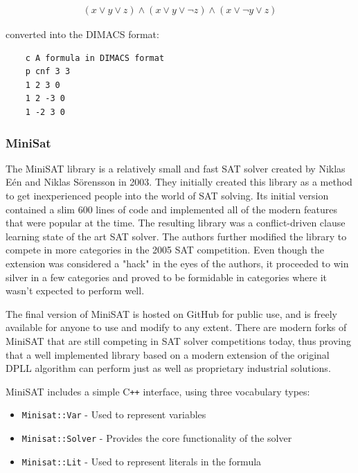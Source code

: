 \documentclass{article}
\begin{document}
\begin{gather*}
    (x\vee y\vee z)\wedge (x\vee y\vee \neg z)\wedge (x\vee \neg y\vee z)
\end{gather*}

converted into the DIMACS format:

\begin{lstlisting}
    c A formula in DIMACS format
    p cnf 3 3
    1 2 3 0
    1 2 -3 0
    1 -2 3 0
\end{lstlisting}


    \subsubsection{MiniSat}
    The MiniSAT library is a relatively small and fast SAT solver created by Niklas Eén and Niklas Sörensson in 2003. They initially created
    this library as a method to get inexperienced people into the world of SAT solving. Its initial version contained a slim 600 lines of
    code and implemented all of the modern features that were popular at the time. The resulting library was a conflict-driven clause
    learning state of the art SAT solver. The authors further modified the library to compete in more categories in the 2005 SAT
    competition. Even though the extension was considered a "hack" in the eyes of the authors, it proceeded to win silver in a few
    categories and proved to be formidable in categories where it wasn't expected to perform well.

    The final version of MiniSAT is hosted on GitHub for public use, and is freely available for anyone to use and modify to any extent.
    There are modern forks of MiniSAT that are still competing in SAT solver competitions today, thus proving that a well implemented
    library based on a modern extension of the original DPLL algorithm can perform just as well as proprietary industrial solutions.

    MiniSAT includes a simple C\texttt{++} interface, using three vocabulary types:

    \begin{itemize}
        \item \texttt{Minisat::Var} - Used to represent variables
        \item \texttt{Minisat::Solver} - Provides the core functionality of the solver
        \item \texttt{Minisat::Lit} - Used to represent literals in the formula
    \end{itemize}
\end{document}
